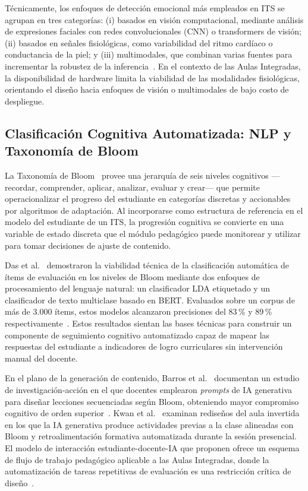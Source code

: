 Técnicamente, los enfoques de detección emocional más empleados en ITS se
agrupan en tres categorías: (i) basados en visión computacional, mediante análisis
de expresiones faciales con redes convolucionales (CNN) o transformers de
visión; (ii) basados en señales fisiológicas, como variabilidad del ritmo
cardíaco o conductancia de la piel; y (iii) multimodales, que combinan varias
fuentes para incrementar la robustez de la inferencia~\cite{Ahmed2025, AISTY2024}.
En el contexto de las Aulas Integradas, la disponibilidad de hardware limita la
viabilidad de las modalidades fisiológicas, orientando el diseño hacia enfoques
de visión o multimodales de bajo costo de despliegue.

\subsection{Clasificación Cognitiva Automatizada: NLP y Taxonomía de Bloom}

La Taxonomía de Bloom~\cite{bloom1956} provee una jerarquía de seis niveles
cognitivos ---recordar, comprender, aplicar, analizar, evaluar y crear--- que
permite operacionalizar el progreso del estudiante en categorías discretas
y accionables por algoritmos de adaptación. Al incorporarse como estructura
de referencia en el modelo del estudiante de
un ITS, la progresión cognitiva se convierte en una variable de
estado discreta que el módulo pedagógico puede monitorear y utilizar para
tomar decisiones de ajuste de contenido.

Das et al.~\cite{Das2020} demostraron la viabilidad técnica de la clasificación
automática de ítems de evaluación en los niveles de Bloom mediante dos enfoques
de procesamiento del lenguaje natural: un clasificador LDA etiquetado y un
clasificador de texto multiclase basado en BERT. Evaluados sobre un corpus de
más de 3.000 ítems, estos modelos alcanzaron precisiones del 83\,\% y 89\,\%
respectivamente~\cite{Das2020}. Estos resultados sientan las bases técnicas para
construir un componente de seguimiento cognitivo automatizado capaz de mapear
las respuestas del estudiante a indicadores de logro curriculares sin
intervención manual del docente.

En el plano de la generación de contenido, Barros et al.~\cite{Barros2025}
documentan un estudio de investigación-acción en el que docentes emplearon
\textit{prompts} de IA generativa para diseñar lecciones secuenciadas según
Bloom, obteniendo mayor compromiso cognitivo de orden superior~\cite{Barros2025}.
Kwan et al.~\cite{Kwan2025} examinan rediseños del aula invertida en los que la
IA generativa produce actividades previas a la clase alineadas con Bloom y
retroalimentación formativa automatizada durante la sesión presencial. El modelo
de interacción estudiante-docente-IA que proponen ofrece un esquema de flujo de
trabajo pedagógico aplicable a las Aulas Integradas, donde la automatización de
tareas repetitivas de evaluación es una restricción crítica de diseño~\cite{Kwan2025}.

